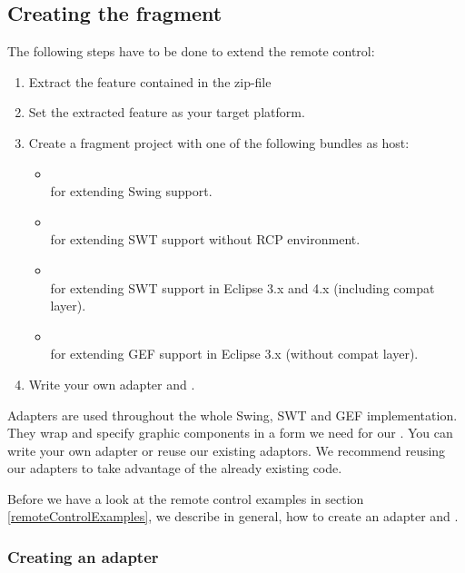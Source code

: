 \subsection{Creating the fragment}

The following steps have to be done to extend the \app{} remote control:

\begin{enumerate}
  \item Extract the feature contained in the zip-file\\
  \item Set the extracted feature as your target platform.
  \item Create a fragment project with one of the following bundles as host:
    \begin{itemize}
      \item {}\\
            for extending Swing support.
      \item {}\\
            for extending SWT support without RCP environment.
      \item {}\\
            for extending SWT support in Eclipse 3.x and 4.x (including compat
            layer).
      \item {}\\
            for extending GEF support in Eclipse 3.x (without compat
            layer).
   \end{itemize}
  \item Write your own adapter and \gdtesterclasses.
\end{enumerate}

Adapters are used throughout the whole Swing, SWT and GEF implementation. They
wrap and specify graphic components in a form we need for our \gdtesterclasses. You
can write your own adapter or reuse our existing adaptors. We recommend
reusing our adapters to take advantage of the already existing code.

Before we have a look at the \app{} remote control examples in section
\ref{remoteControlExamples}, we describe in general, how to create an
adapter and \gdtesterclasses.

\subsubsection{Creating an adapter}

